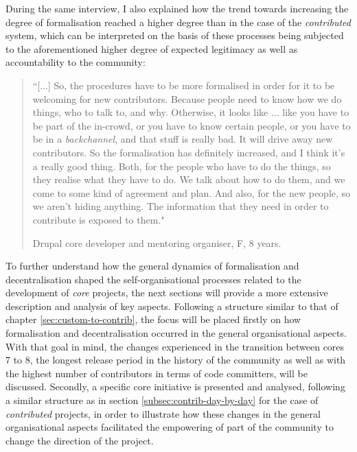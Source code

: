 During the same interview, I also explained how the trend towards increasing the degree of formalisation reached a higher degree than in the case of the \textit{contributed} system, which can be interpreted on the basis of these processes being subjected to the aforementioned higher degree of expected legitimacy as well as accountability to the community:

\begin{quotation}
``[...] So, the procedures have to be more formalised in order for it to be welcoming for new contributors. Because people need to know how we do things, who to talk to, and why. Otherwise, it looks like ... like you have to be part of the in-crowd, or you have to know certain people, or you have to be in a \textit{backchannel}, and that stuff is really bad. It will drive away new contributors. So the formalisation has definitely increased, and I think it's a really good thing. Both, for the people who have to do the things, so they realise what they have to do. We talk about how to do them, and we come to some kind of agreement and plan. And also, for the new people, so we aren't hiding anything. The information that they need in order to contribute is exposed to them."
\begin{flushright}\footnotesize{Drupal core developer and mentoring organiser, F, 8 years.}\end{flushright}
\end{quotation}

To further understand how the general dynamics of formalisation and decentralisation shaped the self-organisational processes related to the development of \textit{core} projects, the next sections will provide a more extensive description and analysis of key aspects. Following a structure similar to that of chapter \ref{sec:custom-to-contrib}, the focus will be placed firstly on how formalisation and decentralisation occurred in the general organisational aspects. With that goal in mind, the changes experienced in the transition between cores 7 to 8, the longest release period in the history of the community as well as with the highest number of contributors in terms of code committers, will be discussed. Secondly, a specific core initiative is presented and analysed, following a similar structure as in section \ref{subsec:contrib-day-by-day} for the case of \textit{contributed} projects, in order to illustrate how these changes in the general organisational aspects facilitated the empowering of part of the community to change the direction of the project.

